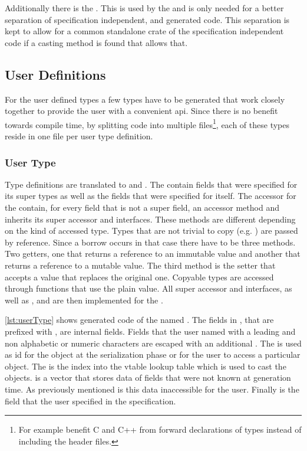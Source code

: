 \documentclass[thesis]{subfiles}
\begin{document}
    Additionally there is the \PoolMaker \trait.
    This \trait is used by the \FileReader and is only needed for a better separation of specification independent, and generated code.
    This separation is kept to allow for a common standalone crate of the specification independent code if a casting method is found that allows that.

  \subsection{User Definitions}
    For the user defined types a few types have to be generated that work closely together to provide the user with a convenient \gls{api}.
    Since there is no benefit towards compile time, by splitting code into multiple files\footnote{
      For example benefit C and C++ from forward declarations of types instead of including the header files.
    }, each of these types reside in one file per user type definition.

    \subsubsection{User Type}
      Type definitions are translated to \structs and \traits.
      The \structs contain fields that were specified for its super types as well as the fields that were specified for itself.
      The accessor \traits for the \structs contain, for every field that is not a super field, an accessor method and inherits its super accessor \traits and interfaces.
      These methods are different depending on the kind of accessed type.
      Types that are not trivial to copy (e.g. \HashMap) are passed by reference.
      Since a borrow occurs in that case there have to be three methods.
      Two getters, one that returns a reference to an immutable value and another that returns a reference to a mutable value.
      The third method is the setter that accepts a value that replaces the original one.
      Copyable types are accessed through functions that use the plain value.
      All super accessor \traits and interfaces, as well as \SkillObject, \ForeignObject and \Deleteable are then implemented for the \struct.

      \autoref{lst:userType} shows generated code of the \UserType named \Age.
      The fields in \Age, that are prefixed with , are internal fields.
      Fields that the user named with a leading  and non alphabetic or numeric characters are escaped with an additional .
      The \skillid is used as id for the object at the serialization phase or for the user to access a particular object.
      The \typeid is the index into the vtable lookup table which is used to cast the objects.
      \foreigndata is a vector that stores data of fields that were not known at generation time.
      As previously mentioned is this data inaccessible for the user.
      Finally is \age the field that the user specified in the specification.
\end{document}
